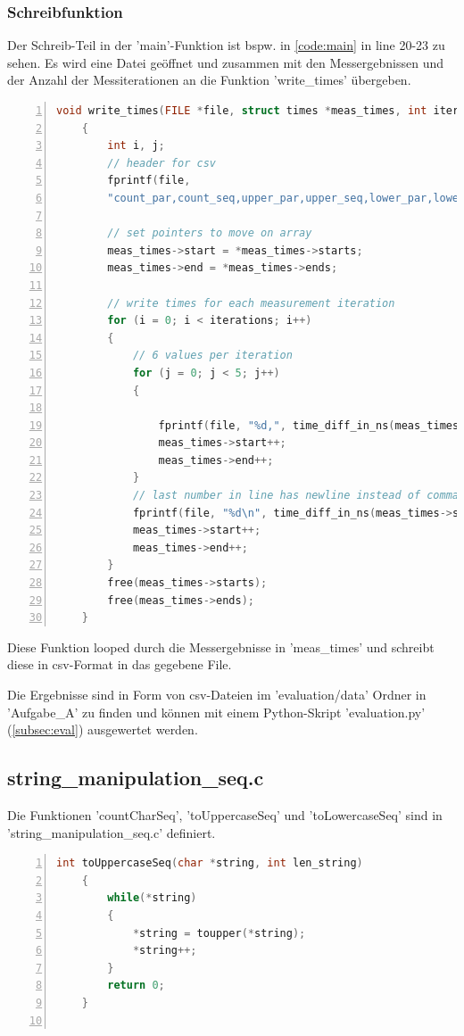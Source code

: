 \documentclass[plainarticle,zihtitle,german,final,hyperref,utf8]{zihpub}
\begin{document}
\subsubsection{Schreibfunktion}
Der Schreib-Teil in der 'main'-Funktion ist bspw. in \ref{code:main} in line 20-23 zu sehen.
Es wird eine Datei geöffnet und zusammen mit den Messergebnissen und der Anzahl der Messiterationen an die Funktion 'write\_times' übergeben.

\begin{lstlisting}[language=c, numbers=left]
	void write_times(FILE *file, struct times *meas_times, int iterations)
	{
		int i, j;
		// header for csv
		fprintf(file,
		"count_par,count_seq,upper_par,upper_seq,lower_par,lower_seq\n");
		
		// set pointers to move on array	
		meas_times->start = *meas_times->starts;
		meas_times->end = *meas_times->ends;
		
		// write times for each measurement iteration
		for (i = 0; i < iterations; i++)
		{
			// 6 values per iteration
			for (j = 0; j < 5; j++)
			{
				
				fprintf(file, "%d,", time_diff_in_ns(meas_times->start, meas_times->end));
				meas_times->start++;
				meas_times->end++;
			}
			// last number in line has newline instead of comma
			fprintf(file, "%d\n", time_diff_in_ns(meas_times->start, meas_times->end));
			meas_times->start++;
			meas_times->end++;
		}
		free(meas_times->starts);
		free(meas_times->ends);
	}
\end{lstlisting}

Diese Funktion looped durch die Messergebnisse in 'meas\_times' und schreibt diese in csv-Format in das gegebene File.

Die Ergebnisse sind in Form von csv-Dateien im 'evaluation/data' Ordner in 'Aufgabe\_A' zu finden und können mit einem Python-Skript 'evaluation.py' (\ref{subsec:eval}) ausgewertet werden.



\subsection{string\_manipulation\_seq.c}
Die Funktionen 'countCharSeq', 'toUppercaseSeq' und 'toLowercaseSeq' sind in 'string\_manipulation\_seq.c' definiert.

\begin{lstlisting}[language=c, numbers=left]
	int toUppercaseSeq(char *string, int len_string)
	{
		while(*string)
		{
			*string = toupper(*string);
			*string++;
		}
		return 0;
	}
	
\end{lstlisting}
\end{document}
